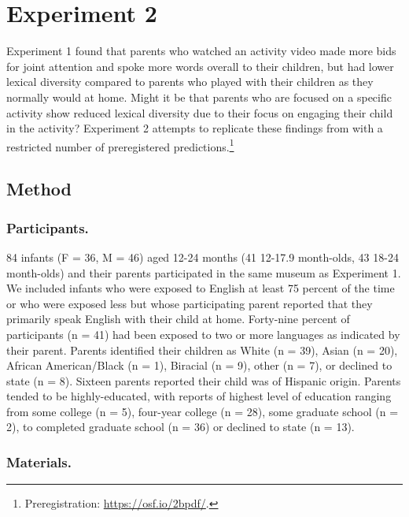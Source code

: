 \documentclass[man,floatsintext]{apa6}
\let\rmarkdownfootnote\footnote%
\def\footnote{\protect\rmarkdownfootnote}
\begin{document}
\hypertarget{experiment-2}{%
\section{Experiment 2}\label{experiment-2}}

Experiment 1 found that parents who watched an activity video made more bids for joint attention and spoke more words overall to their children, but had lower lexical diversity compared to parents who played with their children as they normally would at home.
Might it be that parents who are focused on a specific activity show reduced lexical diversity due to their focus on engaging their child in the activity?
Experiment 2 attempts to replicate these findings from with a restricted number of preregistered predictions.\footnote{Preregistration: \url{https://osf.io/2bpdf/}.}

\hypertarget{method-1}{%
\subsection{Method}\label{method-1}}

\hypertarget{participants.-1}{%
\subsubsection{Participants.}\label{participants.-1}}

84 infants (F = 36, M = 46) aged 12-24 months (41 12-17.9 month-olds, 43 18-24 month-olds) and their parents participated in the same museum as Experiment 1.
We included infants who were exposed to English at least 75 percent of the time or who were exposed less but whose participating parent reported that they primarily speak English with their child at home.
Forty-nine percent of participants (n = 41) had been exposed to two or more languages as indicated by their parent.
Parents identified their children as White (n = 39), Asian (n = 20), African American/Black (n = 1), Biracial (n = 9), other (n = 7), or declined to state (n = 8).
Sixteen parents reported their child was of Hispanic origin.
Parents tended to be highly-educated, with reports of highest level of education ranging from some college (n = 5), four-year college (n = 28), some graduate school (n = 2), to completed graduate school (n = 36) or declined to state (n = 13).

\hypertarget{materials.-1}{%
\subsubsection{Materials.}\label{materials.-1}}
\end{document}
